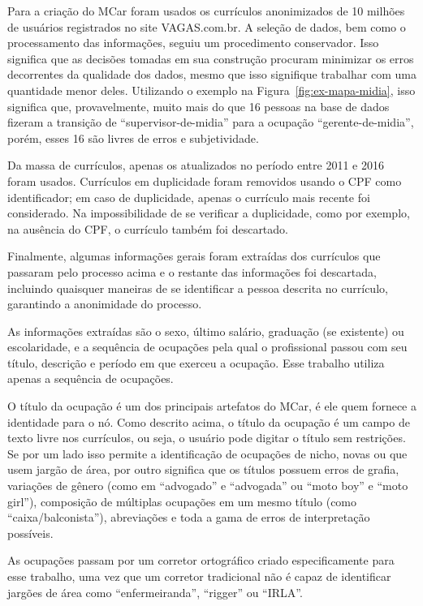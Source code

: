 \documentclass[
  article,
  11pt,
  a4paper,
  english,
  brazil,
  sumario=tradicional]{abntex2}
\begin{document}
Para a criação do MCar foram usados os currículos anonimizados de 10 milhões de usuários registrados no site VAGAS.com.br. A seleção de dados, bem como o processamento das informações, seguiu um procedimento conservador. Isso significa que as decisões tomadas em sua construção procuram minimizar os erros decorrentes da qualidade dos dados, mesmo que isso signifique trabalhar com uma quantidade menor deles. Utilizando o exemplo na Figura~\ref{fig:ex-mapa-midia}, isso significa que, provavelmente, muito mais do que 16 pessoas na base de dados fizeram a transição de \enquote{supervisor-de-midia} para a ocupação \enquote{gerente-de-midia}, porém, esses 16 são livres de erros e subjetividade.

Da massa de currículos, apenas os atualizados no período entre 2011 e 2016 foram usados. Currículos em duplicidade foram removidos usando o CPF como identificador; em caso de duplicidade, apenas o currículo mais recente foi considerado. Na impossibilidade de se verificar a duplicidade, como por exemplo, na ausência do CPF, o currículo também foi descartado.

Finalmente, algumas informações gerais foram extraídas dos currículos que passaram pelo processo acima e o restante das informações foi descartada, incluindo quaisquer maneiras de se identificar a pessoa descrita no currículo, garantindo a anonimidade do processo.

As informações extraídas são o sexo, último salário, graduação (se existente) ou escolaridade, e a sequência de ocupações pela qual o profissional passou com seu título, descrição e período em que exerceu a ocupação. Esse trabalho utiliza apenas a sequência de ocupações.

O título da ocupação é um dos principais artefatos do MCar, é ele quem fornece a identidade para o nó. Como descrito acima, o título da ocupação é um campo de texto livre nos currículos, ou seja, o usuário pode digitar o título sem restrições. Se por um lado isso permite a identificação de ocupações de nicho, novas ou que usem jargão de área, por outro significa que os títulos possuem erros de grafia, variações de gênero (como em \enquote{advogado} e \enquote{advogada} ou \enquote{moto boy} e \enquote{moto girl}), composição de múltiplas ocupações em um mesmo título (como \enquote{caixa/balconista}), abreviações e toda a gama de erros de interpretação possíveis.

As ocupações passam por um corretor ortográfico criado especificamente para esse trabalho, uma vez que um corretor tradicional não é capaz de identificar jargões de área como \enquote{enfermeiranda}, \enquote{rigger} ou \enquote{IRLA}.
\end{document}
